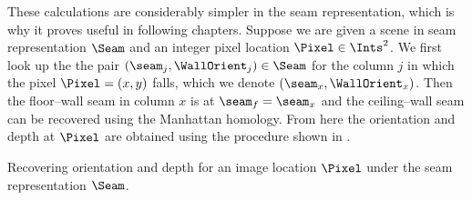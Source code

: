 These calculations are considerably simpler in the seam
representation, which is why it proves useful in following
chapters. Suppose we are given a scene in seam representation $\Seam$
and an integer pixel location $\Pixel\in\Ints^2$. We first look up the
the pair $(\seam_j,\WallOrient_j)\in\Seam$ for the column $j$ in which the
pixel $\Pixel=(x,y)$ falls, which we denote
$(\seam_x,\WallOrient_x)$. Then the floor--wall seam in column
$x$ is at $\seam_f=\seam_x$ and the ceiling--wall seam
can be recovered using the Manhattan homology. From here the
orientation and depth at $\Pixel$ are obtained using the procedure
shown in .

\begin{algorithm}[tb]
  \begin{algorithmic}
    \STATE{}
    \ELSE
    \ENDIF
  \end{algorithmic}
  \caption{\label{alg:seam-depth-orient}
    Recovering orientation and depth for an
    image location $\Pixel$ under the seam representation $\Seam$.}
\end{algorithm}

